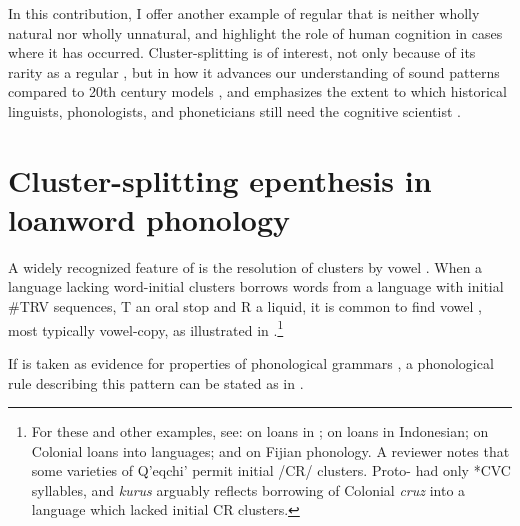 \documentclass[output=paper,
modfonts
]{LSP/langsci}
\begin{document}
In this contribution, I offer another example of regular 
that is neither wholly natural nor wholly unnatural, and highlight the
role of human cognition in cases where it has occurred.
Cluster-splitting  is of interest, not only because of its
rarity as a regular , but in how it advances our
understanding of sound patterns compared to 20th century models \citep{anderson1985a}, and emphasizes the extent to which historical
linguists, phonologists, and phoneticians still need the cognitive
scientist \citep{anderson2001a}.

\section{Cluster-splitting {epenthesis} in {loanword} phonology}

A widely recognized feature of   is the resolution of
clusters by vowel . When a language lacking word-initial
clusters borrows words from a language with initial \#TRV sequences, T
an oral stop and R a liquid, it is common to find vowel , most
typically vowel-copy, as illustrated in .\footnote{For these and
  other examples, see: \citet{blevins2016a} on  loans in
  ; \citet{decasparis1997a} on  loans in Indonesian; \citet{campbell2013a} on Colonial  loans into  languages; and \citet{kenstowicz2007a} on Fijian  phonology. A reviewer notes that some
  varieties of Q'eqchi' permit initial /CR/ clusters. Proto- had
  only *CVC syllables, and  \emph{kurus} arguably reflects
  borrowing of Colonial  \emph{cruz} into a language which lacked
  initial CR clusters.}


If   is taken as evidence for properties of
phonological grammars \citep{hyman1970a}, a phonological rule describing this
pattern can be stated as in .
\end{document}
